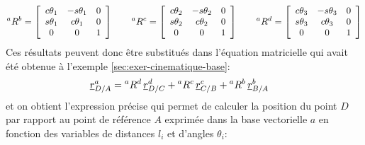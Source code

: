 \begin{align}
{}^aR^b =
\left[ \begin{array}{c c c}
	c\theta_1 & -s\theta_1 & 0 \\
	s\theta_1 & c\theta_1 & 0 \\
	0 & 0 & 1 
\end{array}  \right]
\quad \quad
 {}^aR^c =
\left[ \begin{array}{c c c}
	c\theta_2 & -s\theta_2 & 0 \\
	s\theta_2 & c\theta_2 & 0 \\
	0 & 0 & 1 
\end{array}  \right]
\quad \quad
{}^aR^d =
\left[ \begin{array}{c c c}
	c\theta_3 & -s\theta_3 & 0 \\
	s\theta_3 & c\theta_3 & 0 \\
	0 & 0 & 1 
\end{array}  \right]
\end{align} 
Ces résultats peuvent donc être substitués dans l'équation matricielle qui avait été obtenue à l'exemple \ref{sec:exer-cinematique-base}:
\begin{align}
\underline{r}_{D/A}^a &= {}^aR^d \, \underline{r}_{D/C}^d + {}^aR^c \, \underline{r}_{C/B}^c + {}^aR^b \, \underline{r}_{B/A}^b
\label{eq:ex333cinematique-2}
\end{align} 
et on obtient l’expression précise qui permet de calculer la position du point $D$ par rapport au point de référence $A$ exprimée dans la base vectorielle $a$ en fonction des variables de distances $l_i$ et d'angles $\theta_i$:
